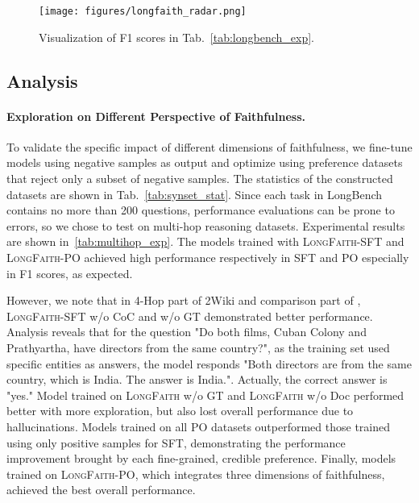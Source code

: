 \begin{figure}[t]
    \centering
    \centerline{\texttt{[image: figures/longfaith\_radar.png]}}
    \caption{Visualization of F1 scores in Tab.~\ref{tab:longbench_exp}.}
    \label{fig:radar}
\end{figure}

\subsection{Analysis}

\paragraph{Exploration on Different Perspective of Faithfulness.} To validate the specific impact of different dimensions of faithfulness, we fine-tune models using negative samples as output and optimize using preference datasets that reject only a subset of negative samples. The statistics of the constructed datasets are shown in Tab.~\ref{tab:synset_stat}. Since each task in LongBench contains no more than 200 questions, performance evaluations can be prone to errors, so we chose to test on multi-hop reasoning datasets. Experimental results are shown in~\ref{tab:multihop_exp}. The models trained with \textsc{LongFaith}-SFT and \textsc{LongFaith}-PO achieved high performance respectively in SFT and PO especially in F1 scores, as expected. 

However, we note that in 4-Hop part of 2Wiki and comparison part of \text{\hotpot}, \textsc{LongFaith}-SFT w/o CoC and w/o GT demonstrated better performance. Analysis reveals that for the question "Do both films, Cuban Colony and Prathyartha, have directors from the same country?", as the training set \text{\musique} used specific entities as answers, the model responds "Both directors are from the same country, which is India. The answer is India.". Actually, the correct answer is "yes." Model trained on \textsc{LongFaith} w/o GT and \textsc{LongFaith} w/o Doc performed better with more exploration, but also lost overall performance due to hallucinations. Models trained on all PO datasets outperformed those trained using only positive samples for SFT, demonstrating the performance improvement brought by each fine-grained, credible preference. Finally, models trained on \textsc{LongFaith}-PO, which integrates three dimensions of faithfulness, achieved the best overall performance.


